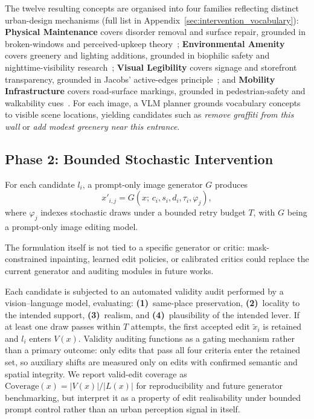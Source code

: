 The twelve resulting concepts are organised into four families
reflecting distinct urban-design mechanisms
(full list in Appendix~\ref{sec:intervention_vocabulary}):
\textbf{Physical Maintenance} covers disorder removal and surface
repair, grounded in broken-windows and perceived-upkeep
theory~\cite{newman1972,jiang2018brokenwindows};
\textbf{Environmental Amenity} covers greenery and lighting additions,
grounded in biophilic safety and nighttime-visibility
research~\cite{li2015greenery,portnov2020lighting};
\textbf{Visual Legibility} covers signage and storefront transparency,
grounded in Jacobs' active-edges principle~\cite{jacobs1961};
and \textbf{Mobility Infrastructure} covers road-surface markings,
grounded in pedestrian-safety and walkability
cues~\cite{quintana2025}.
For each image, a VLM planner grounds vocabulary concepts to visible
scene locations, yielding candidates such as \emph{remove graffiti from
this wall} or \emph{add modest greenery near this entrance}.

\subsection{Phase 2: Bounded Stochastic Intervention}

For each candidate $l_i$, a prompt-only image generator $G$ produces
\begin{equation}
  x'_{i,j} = G(x;\, c_i, s_i, d_i, \tau_i, \varphi_j),
\end{equation}
where $\varphi_j$ indexes stochastic draws under a bounded retry budget
$T$, with $G$ being a prompt-only image editing model.

The formulation itself is not tied to a specific generator or critic:
mask-constrained
inpainting, learned edit policies, or calibrated critics could replace
the current generator and auditing modules in future works.

Each candidate is subjected to an automated validity audit performed by
a vision--language model,
evaluating: \textbf{(1)}~same-place preservation,
\textbf{(2)}~locality to the intended support, \textbf{(3)}~realism,
and \textbf{(4)}~plausibility of the intended lever. If at least one
draw passes within $T$ attempts, the first accepted edit $\tilde{x}_i$
is retained and $l_i$ enters $V(x)$. Validity auditing functions as a
gating mechanism rather than a primary outcome: only edits that pass
all four criteria enter the retained set, so auxiliary shifts are
measured only on edits with confirmed semantic and spatial integrity.
We report valid-edit coverage as
$\mathrm{Coverage}(x) = |V(x)| / |L(x)|$ for reproducibility and future
generator benchmarking, but interpret it as a property of edit
realisability under bounded prompt control rather than an urban
perception signal in itself.


